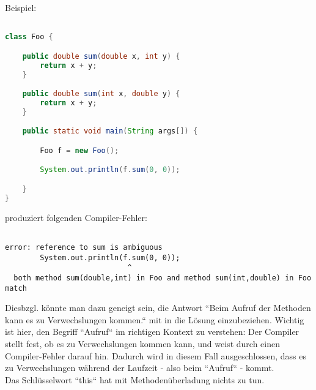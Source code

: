 Beispiel:

\begin{lstlisting}[language=java]

class Foo {

    public double sum(double x, int y) {
        return x + y;
    }

    public double sum(int x, double y) {
        return x + y;
    }

    public static void main(String args[]) {

        Foo f = new Foo();

        System.out.println(f.sum(0, 0));

    }
}
\end{lstlisting}

produziert folgenden Compiler-Fehler:

\begin{lstlisting}[language=text]

error: reference to sum is ambiguous
        System.out.println(f.sum(0, 0));
                            ^
  both method sum(double,int) in Foo and method sum(int,double) in Foo match
\end{lstlisting}


Diesbzgl. könnte man dazu geneigt sein, die Antwort ``Beim Aufruf der Methoden kann es zu Verwechslungen kommen.`` mit in
die Lösung einzubeziehen. Wichtig ist hier, den Begriff ``Aufruf`` im richtigen Kontext zu verstehen: Der Compiler stellt
fest, ob es zu Verwechslungen kommen kann, und weist durch einen Compiler-Fehler darauf hin.
Dadurch wird in diesem Fall ausgeschlossen, dass es zu Verwechslungen während der Laufzeit - also beim ``Aufruf`` - kommt.\\

Das Schlüsselwort ``this`` hat mit Methodenüberladung nichts zu tun.